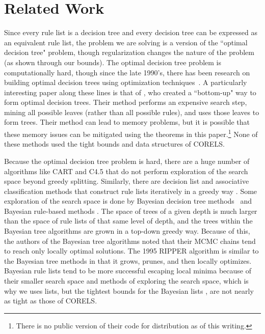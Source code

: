 \section{Related Work}

Since every rule list is a decision tree and every decision tree can be expressed as an equivalent rule list, the problem we are solving is a version of the ``optimal decision tree" problem, though regularization changes the nature of the problem (as shown through our bounds). The optimal decision tree problem is computationally hard, though since the late 1990's, there has been research on building optimal decision trees using optimization techniques~\citep{Bennett96optimaldecision,dobkininduction,FarhangfarGZ08}. A particularly interesting paper along these lines is that of \citet{NijssenFromont2010}, who created a ``bottom-up" way to form optimal decision trees. Their method performs an expensive search step, mining all possible leaves (rather than all possible rules), and uses those leaves to form trees. Their method can lead to memory problems, but it is possible that these memory issues can be mitigated using the theorems in this paper.\footnote{There is no public version of their code for distribution as of this writing.} None of these methods used the tight bounds and data structures of CORELS.

Because the optimal decision tree problem is hard, there are a huge number of algorithms like CART \citep{Breiman84} and C4.5 \citep{Quinlan93} that do not perform exploration of the search space beyond greedy splitting. Similarly, there are decision list and associative classification methods that construct rule lists iteratively in a greedy way
\citep{Rivest87,Liu98,Li01,Yin03,Sokolova03,Marchand05,Vanhoof10,RudinLeMa13}.
Some exploration of the search space is done by Bayesian decision tree methods~\citep{Dension:1998hl,Chipman:2002hc,Chipman10} and Bayesian rule-based methods \citep{LethamRuMcMa15,YangRuSe16}. The space of trees of a given depth is much larger than the space of
rule lists of that same level of depth, and the trees within the Bayesian tree algorithms
are grown in a top-down greedy way. Because of this, the authors of the Bayesian tree algorithms noted that their MCMC chains tend to reach only locally optimal solutions. 
The 1995 RIPPER algorithm \citep{ripper} is similar to the Bayesian tree methods in that it grows, prunes, and then locally optimizes.
Bayesian rule lists tend to be more successful escaping local minima because of their smaller search space and methods of exploring the search space, which is why we uses lists, but the tightest bounds for the Bayesian lists \citep[namely those of][whose work we build from]{YangRuSe16}, are not nearly as tight as those of CORELS.

